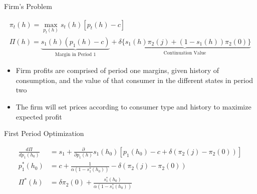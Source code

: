 \documentclass[aspectratio=169,professionalfonts]{beamer}
\newcommand{\shortbuttons}{}
\begin{document}
\gdef\shortbuttons{}
\begin{frame}[label=short-8]{Firm's Problem}
  \begin{tcolorbox}
    [
    boxsep=0pt,
    left=2pt, right=2pt,
    top=1pt, bottom=1pt,
    before skip=2pt, after skip=2pt
    ]
    \setlength{\abovedisplayskip}{2pt}
    \setlength{\belowdisplayskip}{2pt}
    \begin{gather*}
      \pi_t(h) = \max_{p_t(h)} s_t(h)[p_t(h) - c] \\
      \Pi(h) = \underbrace{s_1(h)(p_1(h) - c)}_{\text{Margin in Period 1}} + \underbrace{\delta\{s_1(h)\pi_2(j) + (1-s_1(h))\pi_2(0)\}}_\text{{Continuation Value}}
    \end{gather*}
  \end{tcolorbox}
  \begin{itemize}
    \item Firm profits are comprised of period one margins, given history of consumption, and the value of that consumer in the different states in period two
    \item The firm will set prices according to consumer type and history to maximize expected profit
  \end{itemize}
\end{frame}


\gdef\shortbuttons{\hyperlink{short-9}{\beamergotobutton{Terminal FOC}}\hspace{.35em}\hyperlink{short-11}{\beamergotobutton{Comparative statics}}\hspace{.35em}\hyperlink{short-52}{\beamergotobutton{Elasticities}}}
\begin{frame}[label=short-10]{First Period Optimization}
  \begin{tcolorbox}
    [
    boxsep=0pt,
    left=2pt, right=2pt,
    top=1pt, bottom=1pt,
    before skip=2pt, after skip=2pt
    ]
    \setlength{\abovedisplayskip}{2pt}
    \setlength{\belowdisplayskip}{2pt}
    \begin{align*}
      \frac{d\Pi}{d p_1(h_0)} &= s_1 + \frac{\partial}{\partial p_1(h)}s_1(h_0)[p_1(h_0) - c + \delta(\pi_2(j) - \pi_2(0))] \\
      p_1^*(h_0) &= c + \frac{1}{\alpha(1-s_1^*(h_0))} - \delta(\pi_2(j) - \pi_2(0)) \\
      \Pi^*(h) &= \delta\pi_2(0) + \frac{s_1^*(h_0)}{\alpha(1-s_1^*(h_0))}
    \end{align*}
  \end{tcolorbox}
\end{frame}
\end{document}
